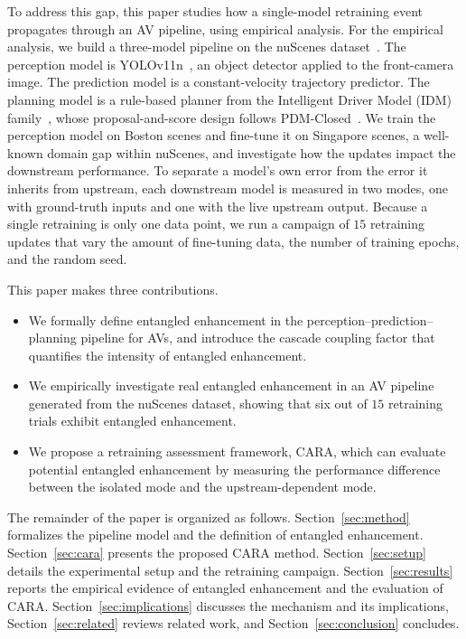 \documentclass[conference]{IEEEtran}
\begin{document}
To address this gap, this paper studies how a single-model retraining event
propagates through an AV pipeline, using empirical analysis. For the empirical analysis, we build a three-model pipeline on the nuScenes
dataset~\cite{caesar2020nuscenes}. The perception model is
YOLOv11n~\cite{jocher2024yolo11}, an object detector applied to the front-camera
image. The prediction model is a constant-velocity trajectory predictor. The
planning model is a rule-based planner from the Intelligent Driver Model (IDM)
family~\cite{treiber2000idm}, whose proposal-and-score design follows
PDM-Closed~\cite{dauner2023parting}. We train the perception model on Boston
scenes and fine-tune it on Singapore scenes, a well-known domain gap within
nuScenes, and investigate how the updates impact the downstream performance. To separate a
model's own error from the error it inherits from upstream, each downstream model
is measured in two modes, one with ground-truth inputs and one with the live
upstream output. Because a single retraining is only one data point, we run a
campaign of $15$ retraining updates that vary the amount of fine-tuning data, the
number of training epochs, and the random seed.

\vspace{2pt}
This paper makes three contributions.
\begin{itemize}[leftmargin=*, itemsep=2pt, topsep=2pt]
\item We formally define entangled enhancement in the
perception--prediction--planning pipeline for AVs, and introduce the cascade coupling factor that quantifies the intensity of entangled enhancement.

\item We empirically investigate real entangled enhancement in an AV pipeline generated from the nuScenes dataset, showing that six out of $15$ retraining trials exhibit entangled enhancement.
\item We propose a retraining assessment framework, CARA, which can evaluate potential entangled enhancement by measuring the performance difference between the isolated mode and the upstream-dependent mode.
\end{itemize}

The remainder of the paper is organized as follows.
Section~\ref{sec:method} formalizes the pipeline model and the definition of
entangled enhancement. Section~\ref{sec:cara} presents the proposed CARA method.
Section~\ref{sec:setup} details the experimental setup and the retraining
campaign. Section~\ref{sec:results} reports the empirical evidence of entangled
enhancement and the evaluation of CARA.
Section~\ref{sec:implications} discusses the mechanism and its implications,
Section~\ref{sec:related} reviews related work, and
Section~\ref{sec:conclusion} concludes.
\end{document}
